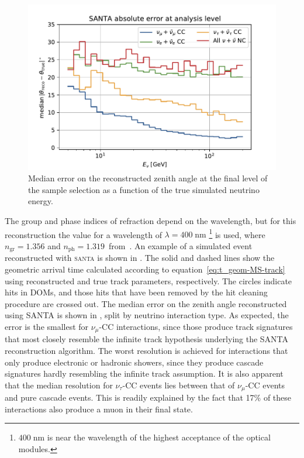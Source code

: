 \begin{figure}
    \centering
    \includegraphics[width=0.8\linewidth]{figures/icecube/reconstruction/santa/santa_absolute_error_final.pdf}
    \caption{Median error on the reconstructed zenith angle at the final level of the sample selection as a function of the true simulated neutrino energy.}
    \label{fig:santa-resolution}
\end{figure}

The group and phase indices of refraction depend on the wavelength, but for this reconstruction the value for a wavelength of $\lambda=400\;\mathrm{nm}$
\footnote{$400\;\mathrm{nm}$ is near the wavelength of the highest acceptance of the optical modules.\cite{icecube_detector_17}} is used, where $n_{\mathrm{gr}}=1.356$ and $n_{\mathrm{ph}}=1.319$~from~. An example of a simulated event reconstructed with \textsc{santa} is shown in . The solid and dashed lines show the geometric arrival time calculated according to equation~\ref{eq:t_geom-MS-track} using reconstructed and true track parameters, respectively. The circles indicate hits in DOMs, and those hits that have been removed by the hit cleaning procedure are crossed out. The median error on the zenith angle reconstructed using \textsc{SANTA} is shown in , split by neutrino interaction type. As expected, the error is the smallest for $\nu_\mu$-CC interactions, since those produce track signatures that most closely resemble the infinite track hypothesis underlying the \textsc{SANTA} reconstruction algorithm. The worst resolution is achieved for interactions that only produce electronic or hadronic showers, since they produce cascade signatures hardly resembling the infinite track assumption. It is also apparent that the median resolution for $\nu_\tau$-CC events lies between that of $\nu_\mu$-CC events and pure cascade events. This is readily explained by the fact that 17\% of these interactions also produce a muon in their final state.

